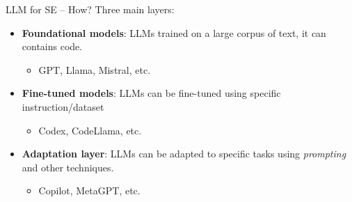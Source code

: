 \documentclass[presentation, 10pt]{beamer}\mode<presentation>{\usetheme{AMSBolognaFC}}
\begin{document}
\begin{frame}{LLM for SE -- How?}
Three main layers:
\begin{itemize}
	\item \textbf{Foundational models}: LLMs trained on a large corpus of text, it can contains code.
	\begin{itemize}
		\item GPT, Llama, Mistral, etc.
	\end{itemize}
	\item \textbf{Fine-tuned models}: LLMs can be fine-tuned using specific instruction/dataset
	\begin{itemize}
		\item Codex, CodeLlama, etc.
	\end{itemize}
	\item \textbf{Adaptation layer}: LLMs can be adapted to specific tasks using \emph{prompting} and other techniques.
	\begin{itemize}
		\item Copilot, MetaGPT, etc.
	\end{itemize}
\end{itemize}
\end{frame}
\end{document}
